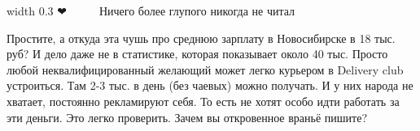 \begin{itemize}
  width 0.3
\fi
❤👏👏👏👏👏👏👏👏💯
Ничего более глупого никогда не читал

Простите, а откуда эта чушь про среднюю зарплату в Новосибирске в 18 тыс. руб?
И дело даже не в статистике, которая показывает около 40 тыс. Просто любой
неквалифицированный желающий может легко курьером в Delivery club устроиться.
Там 2-3 тыс. в день (без чаевых) можно получать. И у них народа не хватает,
постоянно рекламируют себя. То есть не хотят особо идти работать за эти деньги.
Это легко проверить. Зачем вы откровенное враньё пишите?



\end{itemize}
